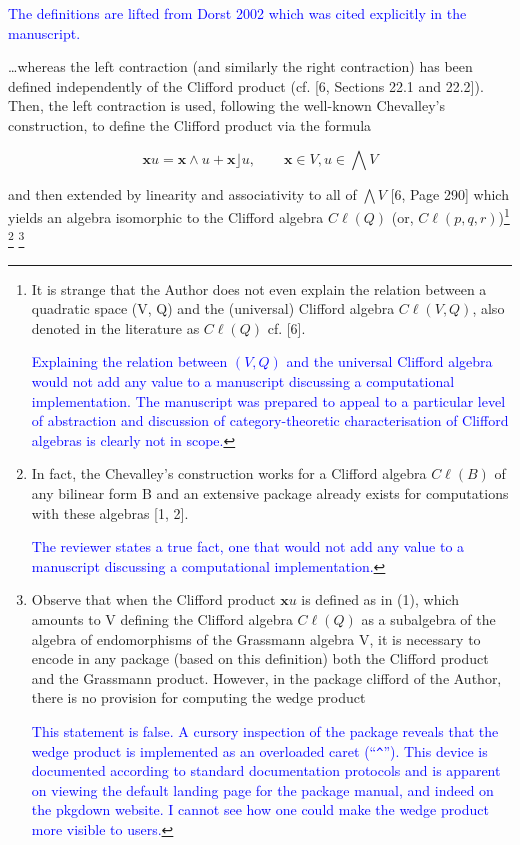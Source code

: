 \documentclass{article}
\newcommand{\cliff}[1]{\ensuremath{C\ell\left(#1\right)}}
\begin{document}
\begin{itemize}
    \textcolor{blue}{The definitions are lifted from Dorst 2002 which
      was cited explicitly in the manuscript.}

    \ldots whereas the left contraction (and similarly the
    right contraction) has been defined independently of the Clifford
    product (cf. [6, Sections 22.1 and 22.2]). Then, the left
    contraction is used, following the well-known Chevalley’s
    construction, to define the Clifford product via the formula

    $$
    \mathbf{x}u=\mathbf{x}\wedge u + \mathbf{x}\rfloor u,\qquad\mathbf{x}\in V,u\in\bigwedge V
    $$

and then extended by linearity and associativity to all of $\bigwedge V$ [6, Page
  290] which yields an algebra isomorphic to the Clifford algebra
\cliff{Q} (or, \cliff{p, q, r})\footnote{It is strange that the Author
does not even explain the relation between a quadratic space (V, Q)
and the (universal) Clifford algebra \cliff{V, Q}, also denoted in the
literature as \cliff{Q} cf. [6].

\textcolor{blue}{Explaining the relation between $(V,Q)$ and the
  universal Clifford algebra would not add any value to a manuscript
  discussing a computational implementation.  The manuscript was
  prepared to appeal to a particular level of abstraction and
  discussion of category-theoretic characterisation of Clifford
  algebras is clearly not in scope.}  } \footnote{In fact, the
Chevalley’s construction works for a Clifford algebra \cliff{B} of any
bilinear form B and an extensive package already exists for
computations with these algebras [1, 2].

\textcolor{blue}{The reviewer states a true fact, one that would not
  add any value to a manuscript discussing a computational
  implementation.}} \footnote{Observe that when the Clifford product
$\mathbf{x}u$ is defined as in (1), which amounts to V defining the Clifford
algebra \cliff{Q} as a subalgebra of the algebra of endomorphisms of
the Grassmann algebra V, it is necessary to encode in any package
(based on this definition) both the Clifford product and the Grassmann
product. However, in the package clifford of the Author, there is no
provision for computing the wedge product

\textcolor{blue}{This statement is false.  A cursory inspection
  of the package reveals that the wedge product is implemented as an
  overloaded caret (``{\tt\string^}'').  This device is documented
  according to standard documentation protocols and is apparent on
  viewing the default landing page for the package manual, and indeed
  on the pkgdown website.  I cannot see how one could make the wedge
  product more visible to users.}  }


\end{itemize}
\end{document}

